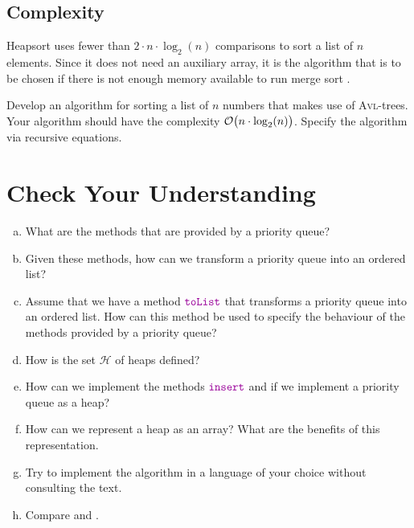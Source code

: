 \subsection{Complexity}
Heapsort uses fewer than $2 \cdot n \cdot \log_2(n)$ comparisons to sort a list of $n$ elements.  Since it does
not need an auxiliary array, it is the algorithm that is to be chosen if there is not enough memory available
to run merge sort \cite{sedgewick:2011}.  

\exercise
Develop an algorithm for sorting a list of $n$ numbers that makes use of \textsc{Avl}-trees.  Your algorithm
should have the complexity $\mathcal{O}\bigl(n \cdot \log_2(n)\bigr)$.  Specify the algorithm via recursive equations.
\eox
\pagebreak

\section{Check Your Understanding}
\begin{enumerate}[(a)]
\item What are the methods that are provided by a priority queue?
\item Given these methods, how can we transform a priority queue into an ordered list?
\item Assume that we have a method $\mytt{toList}$ that transforms a priority queue into
      an ordered list.  How can this method be used to specify the behaviour of the methods
      provided by a priority queue?
\item How is the set $\mathcal{H}$ of heaps defined?
\item How can we implement the methods $\mytt{insert}$ and  if we implement a priority queue as a
      heap? 
\item How can we represent a heap as an array?  What are the benefits of this representation.
\item Try to implement the algorithm  in a language of your choice without consulting the text.
\item Compare  and . 
\end{enumerate}

